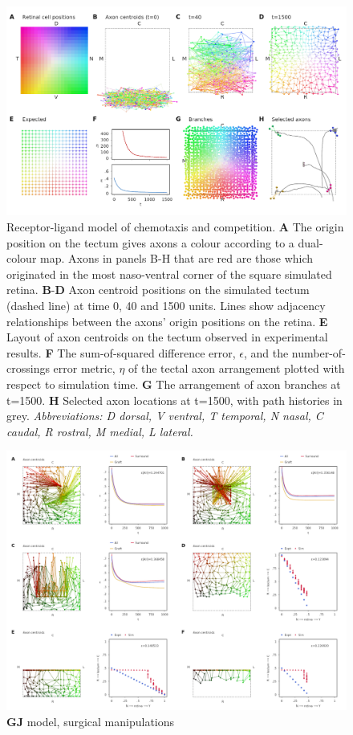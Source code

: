 \documentclass[11pt, a4paper]{article}
\begin{document}
\begin{figure}
\includegraphics[width=\linewidth]{./images/j4_ee_GJ_best_1_wt_fig2_exit_true_steps_1500.png}
\caption{Receptor-ligand model of chemotaxis and competition.
\textbf{A} The origin position on the tectum gives axons a colour according to a dual-colour map. Axons in panels B-H that are red are those which originated in the most naso-ventral corner of the square simulated retina.
\textbf{B}-\textbf{D} Axon centroid positions on the simulated tectum (dashed line) at time 0, 40 and 1500 units. Lines show adjacency relationships between the axons' origin positions on the retina.
\textbf{E} Layout of axon centroids on the tectum observed in experimental results.
\textbf{F} The sum-of-squared difference error, $\epsilon$, and the number-of-crossings error metric, $\eta$ of the tectal axon arrangement plotted with respect to simulation time.
\textbf{G} The arrangement of axon branches at t=1500.
\textbf{H} Selected axon locations at t=1500, with path histories in grey.
\emph{Abbreviations: D dorsal, V ventral, T temporal, N nasal, C caudal, R rostral, M medial, L lateral.}}
\label{f:GJ}
\end{figure}

\begin{figure}
\includegraphics[width=\linewidth]{./images/fig_GJ_surgical.png}
\caption{$\mathbf{GJ}$ model, surgical manipulations}
\label{f:GJsurg}
\end{figure}
\end{document}
